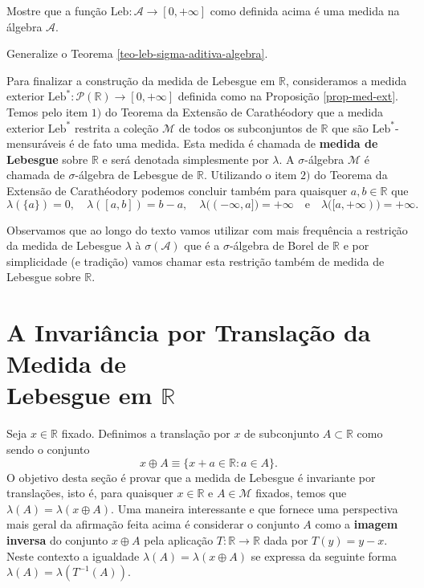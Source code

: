 \begin{exercicio}
	Mostre que a função $\mathrm{Leb}:\mathcal{A}\to [0,+\infty]$ como
	definida acima é uma medida na álgebra $\mathcal{A}$.
\end{exercicio}
\vspace*{-0.3cm}
 Generalize o Teorema \ref{teo-leb-sigma-aditiva-algebra}.
\bigskip

Para finalizar a construção da medida de Lebesgue em 
$\mathbb{R}$, consideramos a medida exterior 
$\mathrm{Leb}^*:\mathcal{P}(\mathbb{R})\to [0,+\infty]$ 
definida como na Proposição \ref{prop-med-ext}.
Temos pelo item $1)$ do 
Teorema da Extensão de Carathéodory 
que a medida exterior $\mathrm{Leb}^*$ restrita a coleção $\mathcal{M}$
de todos os subconjuntos de $\mathbb{R}$ que são
$\mathrm{Leb}^*$-mensuráveis é de fato uma medida. 
Esta medida é chamada de {\bf medida de Lebesgue} sobre $\mathbb{R}$ e será denotada
simplesmente por $\lambda$. A $\sigma$-álgebra $\mathcal{M}$ é 
chamada de $\sigma$-álgebra de Lebesgue de $\mathbb{R}$.
 Utilizando o item $2)$ do 
Teorema da Extensão de Carathéodory podemos concluir também 
para quaisquer $a,b\in \mathbb{R}$ que 
\[
\lambda(\{a\})=0,
\quad
\lambda([a,b])=b-a,
\quad
\lambda\big((-\infty,a]\big)=+\infty
\quad
\text{e}
\quad 
\lambda\big([a,+\infty)\big)=+\infty.
\]

Observamos que ao longo do texto vamos utilizar
com mais frequência a restrição da 
medida de Lebesgue $\lambda$ à $\sigma(\mathcal{A})$
que é a $\sigma$-álgebra de Borel de $\mathbb{R}$ e
por simplicidade (e tradição)
vamos chamar esta restrição também de medida de Lebesgue
sobre $\mathbb{R}$.








\section[A Invariância por Translação da Medida de Lebesgue em $\mathbb{R}$]
{A Invariância por Translação da Medida de\\ Lebesgue em $\mathbb{R}$}


Seja $x\in\mathbb{R}$ fixado. Definimos a 
translação por $x$ de subconjunto $A\subset \mathbb{R}$ 
como sendo o conjunto 
\[
x\oplus A \equiv \{x+a\in \mathbb{R}: a\in A\}.
\]
O objetivo desta seção é provar que a medida de 
Lebesgue é invariante por translações, isto é, 
para quaisquer $x\in\mathbb{R}$ e $A\in\mathcal{M}$ fixados,
temos que $\lambda(A)=\lambda(x\oplus A)$.
Uma maneira interessante e que fornece uma 
perspectiva mais geral da afirmação feita acima
é considerar o conjunto $A$ como a {\bf imagem inversa} do 
conjunto $x\oplus A$ pela aplicação $T:\mathbb{R}\to\mathbb{R}$ 
dada por $T(y)=y-x$.
Neste contexto a igualdade 
$\lambda(A)=\lambda(x\oplus A)$ 
se expressa da seguinte forma 
$\lambda(A)=\lambda(T^{-1}(A))$. 


